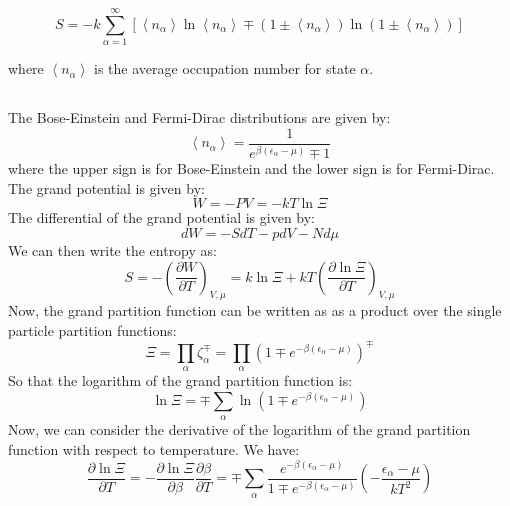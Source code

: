 \documentclass[12pt]{article}
\begin{document}
$$
S=-k \sum_{\alpha=1}^{\infty}\left[\left\langle n_{\alpha}\right\rangle \ln \left\langle n_{\alpha}\right\rangle \mp\left(1 \pm\left\langle n_{\alpha}\right\rangle\right) \ln \left(1 \pm\left\langle n_{\alpha}\right\rangle\right)\right]
$$

where $\left\langle n_{\alpha}\right\rangle$ is the average occupation number for state $\alpha$.
\subsection{}
The Bose-Einstein and Fermi-Dirac distributions are given by:
\begin{equation}
  \left\langle n_{\alpha}\right\rangle=\frac{1}{e^{\beta\left(\epsilon_{\alpha}-\mu\right)}\mp 1}
\end{equation}
where the upper sign is for Bose-Einstein and the lower sign is for Fermi-Dirac.
The grand potential is given by:
\begin{equation}
  W = -PV = -kT\ln \Xi
\end{equation}
The differential of the grand potential is given by:
\begin{equation}
  dW = -SdT - pdV - N d\mu
\end{equation}
We can then write the entropy as:
\begin{equation}
  S = -\left(\frac{\partial W}{\partial T}\right)_{V,\mu} = k \ln \Xi + kT\left(\frac{\partial \ln \Xi}{\partial T}\right)_{V,\mu}
\end{equation}
Now, the grand partition function can be written as as a product over the single particle partition functions:
\begin{equation}
  \Xi = \prod_{\alpha} \zeta_{\alpha}^{\mp} = \prod_{\alpha} \left(1\mp e^{-\beta\left(\epsilon_{\alpha}-\mu\right)}\right)^{\mp}
\end{equation}
So that the logarithm of the grand partition function is:
\begin{equation}
  \ln \Xi = \mp \sum_{\alpha} \ln \left(1\mp e^{-\beta\left(\epsilon_{\alpha}-\mu\right)}\right)
\end{equation}
Now, we can consider the derivative of the logarithm of the grand partition function with respect to temperature. We have:
\begin{equation}
  \frac{\partial \ln \Xi}{\partial T} = -\frac{\partial \ln \Xi}{\partial \beta}\frac{\partial \beta}{\partial T} = \mp \sum_{\alpha} \frac{e^{-\beta\left(\epsilon_{\alpha}-\mu\right)}}{1\mp e^{-\beta\left(\epsilon_{\alpha}-\mu\right)}}\left(-\frac{\epsilon_{\alpha}-\mu}{kT^2}\right)
\end{equation}
\end{document}
